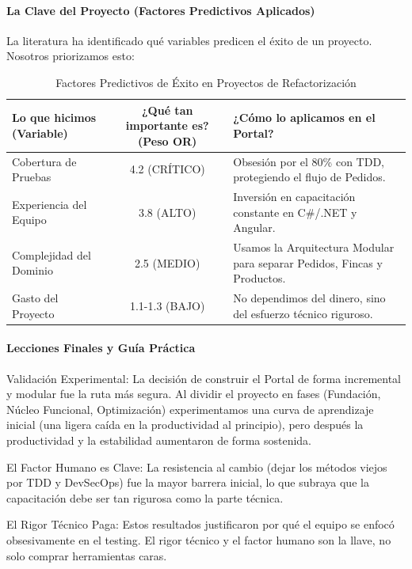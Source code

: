 \paragraph{La Clave del Proyecto (Factores Predictivos Aplicados)}

La literatura ha identificado qué variables predicen el éxito de un proyecto. Nosotros priorizamos esto:

\begin{table}[htbp]
\centering
\small
\begin{tabular}{|p{3cm}|c|p{4.5cm}|}
\hline
\textbf{Lo que hicimos (Variable)} & \textbf{¿Qué tan importante es? (Peso OR)} & \textbf{¿Cómo lo aplicamos en el Portal?} \\
\hline
Cobertura de Pruebas & 4.2 (CRÍTICO) & Obsesión por el 80\% con TDD, protegiendo el flujo de Pedidos. \\
\hline
Experiencia del Equipo & 3.8 (ALTO) & Inversión en capacitación constante en C\#/.NET y Angular. \\
\hline
Complejidad del Dominio & 2.5 (MEDIO) & Usamos la Arquitectura Modular para separar Pedidos, Fincas y Productos. \\
\hline
Gasto del Proyecto & 1.1-1.3 (BAJO) & No dependimos del dinero, sino del esfuerzo técnico riguroso. \\
\hline
\end{tabular}
\caption{Factores Predictivos de Éxito en Proyectos de Refactorización}
\end{table}

\paragraph{Lecciones Finales y Guía Práctica}

Validación Experimental: La decisión de construir el Portal de forma incremental y modular fue la ruta más segura. Al dividir el proyecto en fases (Fundación, Núcleo Funcional, Optimización) experimentamos una curva de aprendizaje inicial (una ligera caída en la productividad al principio), pero después la productividad y la estabilidad aumentaron de forma sostenida.

El Factor Humano es Clave: La resistencia al cambio (dejar los métodos viejos por TDD y DevSecOps) fue la mayor barrera inicial, lo que subraya que la capacitación debe ser tan rigurosa como la parte técnica.

El Rigor Técnico Paga: Estos resultados justificaron por qué el equipo se enfocó obsesivamente en el testing. El rigor técnico y el factor humano son la llave, no solo comprar herramientas caras.


